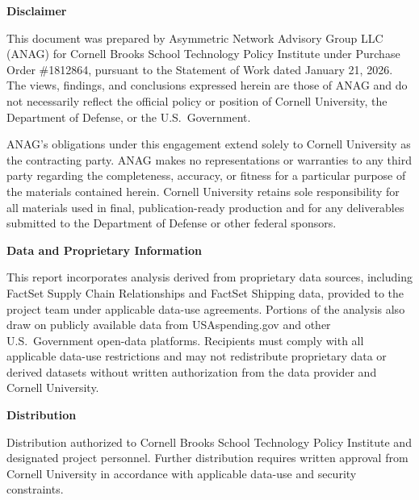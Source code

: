 \thispagestyle{empty}

\noindent \textbf{Disclaimer}\par
\vspace{0.15in}

\noindent This document was prepared by Asymmetric Network Advisory Group LLC (ANAG) for Cornell Brooks School Technology Policy Institute under Purchase Order \#1812864, pursuant to the Statement of Work dated January 21, 2026. The views, findings, and conclusions expressed herein are those of ANAG and do not necessarily reflect the official policy or position of Cornell University, the Department of Defense, or the U.S.\ Government.\par

\vspace{0.15in}

\noindent ANAG's obligations under this engagement extend solely to Cornell University as the contracting party. ANAG makes no representations or warranties to any third party regarding the completeness, accuracy, or fitness for a particular purpose of the materials contained herein. Cornell University retains sole responsibility for all materials used in final, publication-ready production and for any deliverables submitted to the Department of Defense or other federal sponsors.\par

\vspace{0.25in}
\noindent \textbf{Data and Proprietary Information}\par
\vspace{0.10in}

\noindent This report incorporates analysis derived from proprietary data sources, including FactSet Supply Chain Relationships and FactSet Shipping data, provided to the project team under applicable data-use agreements. Portions of the analysis also draw on publicly available data from USAspending.gov and other U.S.\ Government open-data platforms. Recipients must comply with all applicable data-use restrictions and may not redistribute proprietary data or derived datasets without written authorization from the data provider and Cornell University.\par

\vspace{0.25in}
\noindent \textbf{Distribution}\par
\vspace{0.10in}

\noindent Distribution authorized to Cornell Brooks School Technology Policy Institute and designated project personnel. Further distribution requires written approval from Cornell University in accordance with applicable data-use and security constraints.\par

\clearpage
